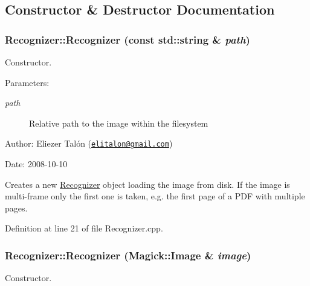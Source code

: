 \subsection{Constructor \& Destructor Documentation}
\hypertarget{class_recognizer_50ffc181208bb07ae651aba6249ee7e4}{
\subsubsection[Recognizer]{\setlength{\rightskip}{0pt plus 5cm}Recognizer::Recognizer (const std::string \& {\em path})}}
\label{class_recognizer_50ffc181208bb07ae651aba6249ee7e4}


Constructor. 

\begin{Desc}
\item[Parameters:]
\begin{description}
\item[{\em path}]Relative path to the image within the filesystem\end{description}
\end{Desc}
\begin{Desc}
\item[Author:]Eliezer Talón (\href{mailto:elitalon@gmail.com}{\tt elitalon@gmail.com}) \end{Desc}
\begin{Desc}
\item[Date:]2008-10-10\end{Desc}
Creates a new \hyperlink{class_recognizer}{Recognizer} object loading the image from disk. If the image is multi-frame only the first one is taken, e.g. the first page of a PDF with multiple pages. 

Definition at line 21 of file Recognizer.cpp.\hypertarget{class_recognizer_01e0b85a6ad9cfbf6fcab4fe4b294640}{
\subsubsection[Recognizer]{\setlength{\rightskip}{0pt plus 5cm}Recognizer::Recognizer (Magick::Image \& {\em image})}}
\label{class_recognizer_01e0b85a6ad9cfbf6fcab4fe4b294640}


Constructor. 

